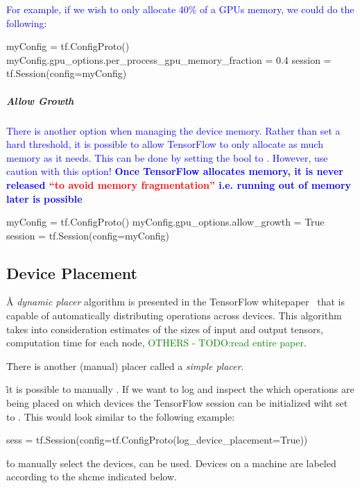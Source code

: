 \textcolor{blue}{For example, if we wish to only allocate 40\% of a GPUs memory, we could do the following:}

\begin{python}
myConfig = tf.ConfigProto()
myConfig.gpu_options.per_process_gpu_memory_fraction = 0.4
session = tf.Session(config=myConfig)
\end{python}


\subparagraph{Allow Growth}

\textcolor{blue}{There is another option when managing the device memory. Rather than set a hard threshold, it is possible to allow TensorFlow to only allocate as much memory as it needs. This can be done by setting the  bool to . However, use caution with this option! \textbf{Once TensorFlow allocates memory, it is never released \textcolor{red}{``to avoid memory fragmentation''} i.e. running out of memory later is possible}}

\begin{python}
myConfig = tf.ConfigProto()
myConfig.gpu_options.allow_growth = True
session = tf.Session(config=myConfig)
\end{python}


\subsection{Device Placement}

\r{A \textit{dynamic placer} algorithm is presented in the {TensorFlow whitepaper}~\cite{abadi2016tensorflow_device_placement} that is capable of automatically distributing operations across devices. This algorithm takes into consideration  estimates of the sizes of input and output tensors, computation time for each node, \textcolor{green}{OTHERS - TODO:read entire paper}.}

\r{There is another (manual) placer called a \textit{simple placer}.}


\r{it is possible to manually  . If we want to log and inspect the which operations are being placed on which devices the TensorFlow session can be initialized wiht  set to . This would look similar to the following example: }

\begin{python}
sess = tf.Session(config=tf.ConfigProto(log_device_placement=True))
\end{python}

\r{to manually select the devices,  can be used. Devices on a machine are labeled according to the shcme indicated below.}

